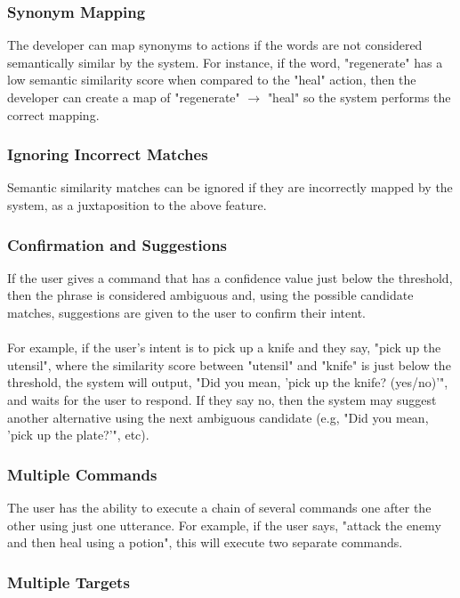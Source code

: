 \documentclass[12pt]{article}
\begin{document}
\subsubsection{Synonym Mapping}

The developer can map synonyms to actions if the words are not considered semantically similar by the system. For instance, if the word, "regenerate" has a low semantic similarity score when compared to the "heal" action, then the developer can create a map of "regenerate" $\rightarrow$ "heal" so the system performs the correct mapping.

\subsubsection{Ignoring Incorrect Matches}

Semantic similarity matches can be ignored if they are incorrectly mapped by the system, as a juxtaposition to the above feature.

\subsubsection{Confirmation and Suggestions}

If the user gives a command that has a confidence value just below the threshold, then the phrase is considered ambiguous and, using the possible candidate matches, suggestions are given to the user to confirm their intent. 
\\
\\
For example, if the user's intent is to pick up a knife and they say, "pick up the utensil", where the similarity score between "utensil" and "knife" is just below the threshold, the system will output, "Did you mean, 'pick up the knife? (yes/no)'", and waits for the user to respond. If they say no, then the system may suggest another alternative using the next ambiguous candidate (e.g, "Did you mean, 'pick up the plate?'", etc).

\subsubsection{Multiple Commands}

The user has the ability to execute a chain of several commands one after the other using just one utterance. For example, if the user says, "attack the enemy and then heal using a potion", this will execute two separate commands.

\subsubsection{Multiple Targets}
\end{document}
